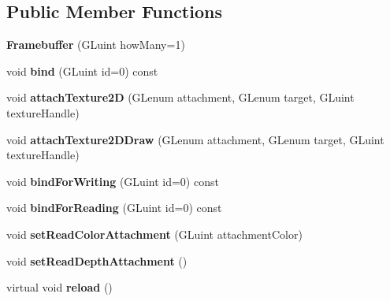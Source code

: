 \subsection*{Public Member Functions}
\begin{DoxyCompactItemize}
\item 
{\bfseries Framebuffer} (G\+Luint how\+Many=1)\hypertarget{classflw_1_1flc_1_1Framebuffer_a26f65451d5e89e0fedd6e561e4d52cff}{}\label{classflw_1_1flc_1_1Framebuffer_a26f65451d5e89e0fedd6e561e4d52cff}

\item 
void {\bfseries bind} (G\+Luint id=0) const \hypertarget{classflw_1_1flc_1_1Framebuffer_a2bddb10fd6e6cab1b61bf354019c9336}{}\label{classflw_1_1flc_1_1Framebuffer_a2bddb10fd6e6cab1b61bf354019c9336}

\item 
void {\bfseries attach\+Texture2D} (G\+Lenum attachment, G\+Lenum target, G\+Luint texture\+Handle)\hypertarget{classflw_1_1flc_1_1Framebuffer_a1bc551a6f679db926250460486ed591f}{}\label{classflw_1_1flc_1_1Framebuffer_a1bc551a6f679db926250460486ed591f}

\item 
void {\bfseries attach\+Texture2\+D\+Draw} (G\+Lenum attachment, G\+Lenum target, G\+Luint texture\+Handle)\hypertarget{classflw_1_1flc_1_1Framebuffer_a20cfb02c1ff5841c1a90e58b8fdb1cf1}{}\label{classflw_1_1flc_1_1Framebuffer_a20cfb02c1ff5841c1a90e58b8fdb1cf1}

\item 
void {\bfseries bind\+For\+Writing} (G\+Luint id=0) const \hypertarget{classflw_1_1flc_1_1Framebuffer_adafa854838598413254e2e8a26d42e7d}{}\label{classflw_1_1flc_1_1Framebuffer_adafa854838598413254e2e8a26d42e7d}

\item 
void {\bfseries bind\+For\+Reading} (G\+Luint id=0) const \hypertarget{classflw_1_1flc_1_1Framebuffer_a47d5d879658d2b872c7f5d6049c30134}{}\label{classflw_1_1flc_1_1Framebuffer_a47d5d879658d2b872c7f5d6049c30134}

\item 
void {\bfseries set\+Read\+Color\+Attachment} (G\+Luint attachment\+Color)\hypertarget{classflw_1_1flc_1_1Framebuffer_a6c4f090bf34b3d50bc6ba3bd642f4448}{}\label{classflw_1_1flc_1_1Framebuffer_a6c4f090bf34b3d50bc6ba3bd642f4448}

\item 
void {\bfseries set\+Read\+Depth\+Attachment} ()\hypertarget{classflw_1_1flc_1_1Framebuffer_a4c407fdc426e9be189457eb20c6a1f70}{}\label{classflw_1_1flc_1_1Framebuffer_a4c407fdc426e9be189457eb20c6a1f70}

\item 
virtual void {\bfseries reload} ()\hypertarget{classflw_1_1flc_1_1Framebuffer_a1ebc408b16d41bb783768d152b9bf939}{}\label{classflw_1_1flc_1_1Framebuffer_a1ebc408b16d41bb783768d152b9bf939}

\end{DoxyCompactItemize}
